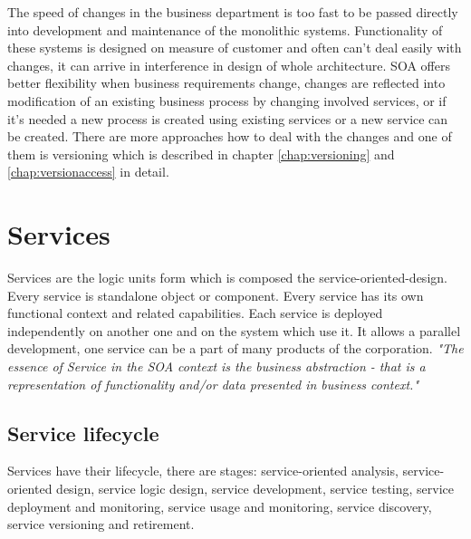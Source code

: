 The speed of changes in the business department is too fast to be passed directly into development and maintenance of the monolithic systems. Functionality of these systems is designed on measure of customer and often can't deal easily with changes, it can arrive in interference in design of whole architecture. SOA offers better flexibility when business requirements change, changes are reflected into modification of an existing business process by changing involved services, or if it's needed a new process is created using existing services or a new service can be created. There are more approaches how to deal with the changes and one of them is versioning which is described in chapter \ref{chap:versioning} and \ref{chap:versionaccess} in detail.

\section{Services}
\label{sec:services}
Services are the logic units form which is composed the \gls{service-oriented-design}. Every service is standalone object or component. Every service has its own functional context and related capabilities. Each service is deployed independently on another one and on the system which use it. It allows a parallel development, one service can be a part of many products of the corporation.
\textit{"The essence of Service in the SOA context is the business abstraction - that is a representation of functionality and/or data presented in business context."} \cite{agile-architecture}

\subsection{Service lifecycle}
\label{subsec:lifecycle}
Services have their lifecycle, there are stages:
service-oriented analysis, service-oriented design, service logic design, service development, service testing, service deployment and monitoring, service usage and monitoring, service discovery, service versioning and retirement. \cite{soa-governance}

